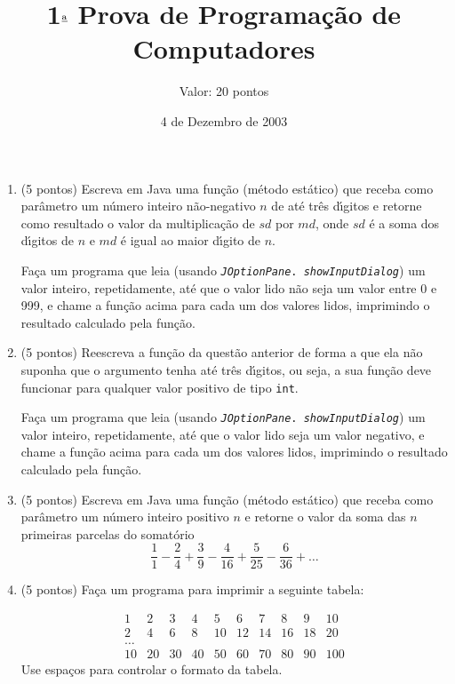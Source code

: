\documentclass{article}
\title{1$^{\underline{{\rm{a}}}}$ Prova de Programa\c{c}\~ao de Computadores}
\date{4 de Dezembro de 2003}
\author{Valor: 20 pontos}
\begin{document}
\maketitle

\begin{enumerate}

\item (5 pontos) Escreva em Java uma fun\c{c}\~ao (m\'etodo
est\'atico) que receba como par\^ametro um n\'umero inteiro
n\~ao-negativo $n$ de at\'e tr\^es d\'{\i}gitos e retorne como
resultado o valor da multiplica\c{c}\~ao de $sd$ por $md$, onde $sd$
\'e a soma dos d\'{\i}gitos de $n$ e $md$ \'e igual ao maior
d\'{\i}gito de $n$.

Fa\c{c}a um programa que leia (usando {\tt {\it JOptionPane}.{\it
showInputDialog\/}}) um valor inteiro, repetidamente, at\'e que o
valor lido n\~ao seja um valor entre 0 e 999, e chame a fun\c{c}\~ao
acima para cada um dos valores lidos, imprimindo o resultado calculado
pela fun\c{c}\~ao.

\item (5 pontos) Reescreva a fun\c{c}\~ao da quest\~ao anterior de
forma a que ela n\~ao suponha que o argumento tenha at\'e tr\^es
d\'{\i}gitos, ou seja, a sua fun\c{c}\~ao deve funcionar para qualquer
valor positivo de tipo {\tt int}.

Fa\c{c}a um programa que leia (usando {\tt {\it JOptionPane}.{\it
showInputDialog\/}}) um valor inteiro, repetidamente, at\'e que o valor
lido seja um valor negativo, e chame a fun\c{c}\~ao acima para cada um
dos valores lidos, imprimindo o resultado calculado pela fun\c{c}\~ao.

\item (5 pontos) Escreva em Java uma fun\c{c}\~ao (m\'etodo
est\'atico) que receba como par\^ametro um n\'umero inteiro positivo
$n$ e retorne o valor da soma das $n$ primeiras parcelas do
somat\'orio \[
\frac{1}{1} - \frac{2}{4} + \frac{3}{9} - \frac{4}{16} +
\frac{5}{25} - \frac{6}{36} + \ldots \]

\item (5 pontos) Fa\c{c}a um programa para imprimir a seguinte tabela:

 \[ \begin{array}{llllllllll}
      1 & 2 & 3 & 4 & 5 & 6 & 7 & 8 & 9 & 10\\
      2 & 4 & 6 & 8 & 10 & 12 & 14 & 16 & 18 & 20\\
      \ldots\\
      10 & 20 & 30 & 40 & 50 & 60 & 70 & 80 & 90 & 100
    \end{array}
  \]
Use espa\c{c}os para controlar o formato da tabela.

\end{enumerate}
\end{document}
